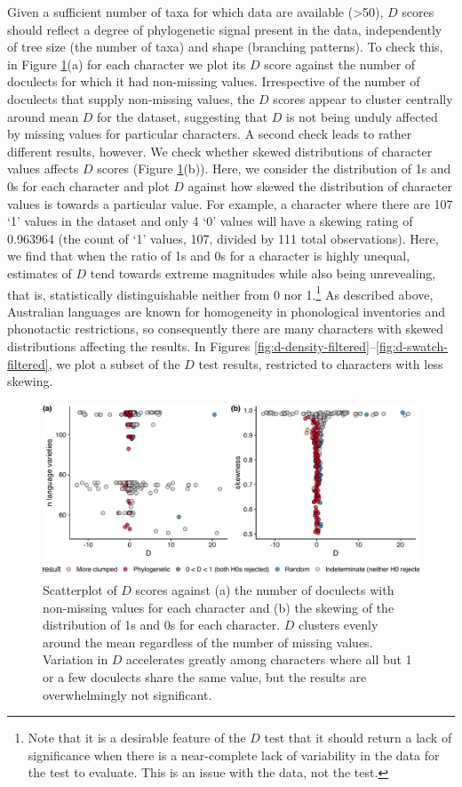 Given a sufficient number of taxa for which data are available (\textgreater{}50), \(D\) scores should reflect a degree of phylogenetic signal present in the data, independently of tree size (the number of taxa) and shape (branching patterns). To check this, in Figure \ref{fig:d-scatterplots}(a) for each character we plot its \(D\) score against the number of doculects for which it had non-missing values. Irrespective of the number of doculects that supply non-missing values, the \(D\) scores appear to cluster centrally around mean \(D\) for the dataset, suggesting that \(D\) is not being unduly affected by missing values for particular characters. A second check leads to rather different results, however. We check whether skewed distributions of character values affects \(D\) scores (Figure \ref{fig:d-scatterplots}(b)). Here, we consider the distribution of 1s and 0s for each character and plot \(D\) against how skewed the distribution of character values is towards a particular value. For example, a character where there are 107 `1' values in the dataset and only 4 `0' values will have a skewing rating of 0.963964 (the count of `1' values, 107, divided by 111 total observations). Here, we find that when the ratio of 1s and 0s for a character is highly unequal, estimates of \(D\) tend towards extreme magnitudes while also being unrevealing, that is, statistically distinguishable neither from 0 nor 1.\footnote{Note that it is a desirable feature of the \(D\) test that it should return a lack of significance when there is a near-complete lack of variability in the data for the test to evaluate. This is an issue with the data, not the test.} As described above, Australian languages are known for homogeneity in phonological inventories and phonotactic restrictions, so consequently there are many characters with skewed distributions affecting the results. In Figures \ref{fig:d-density-filtered}--\ref{fig:d-swatch-filtered}, we plot a subset of the \(D\) test results, restricted to characters with less skewing.

\begin{figure}
\includegraphics[width=1\linewidth]{05-phylo-signal/fig/d-scatterplots} \caption{Scatterplot of $D$ scores against (a) the number of doculects with non-missing values for each character and (b) the skewing of the distribution of 1s and 0s for each character. $D$ clusters evenly around the mean regardless of the number of missing values. Variation in $D$ accelerates greatly among characters where all but 1 or a few doculects share the same value, but the results are overwhelmingly not significant.}\label{fig:d-scatterplots}
\end{figure}

